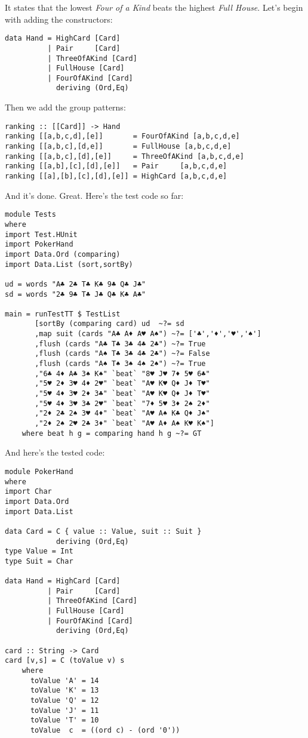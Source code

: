 It states that the lowest \emph{Four of a Kind} beats the highest \emph{Full House}.
\lhA \error Let's begin with adding the constructors:
\begin{lstlisting}[frame=single]
data Hand = HighCard [Card]
          | Pair     [Card]
          | ThreeOfAKind [Card]
          | FullHouse [Card]
          | FourOfAKind [Card]
            deriving (Ord,Eq)
\end{lstlisting}
\error Then we add the group patterns:
\begin{lstlisting}[frame=single]
ranking :: [[Card]] -> Hand
ranking [[a,b,c,d],[e]]       = FourOfAKind [a,b,c,d,e]
ranking [[a,b,c],[d,e]]       = FullHouse [a,b,c,d,e]
ranking [[a,b,c],[d],[e]]     = ThreeOfAKind [a,b,c,d,e]
ranking [[a,b],[c],[d],[e]]   = Pair     [a,b,c,d,e]
ranking [[a],[b],[c],[d],[e]] = HighCard [a,b,c,d,e] 
\end{lstlisting}
\success And it's done.
\lhN Great. Here's the test code so far:
\begin{lstlisting}[frame=single]
module Tests
where 
import Test.HUnit
import PokerHand
import Data.Ord (comparing)
import Data.List (sort,sortBy)

ud = words "A♣ 2♣ T♣ K♣ 9♣ Q♣ J♣"
sd = words "2♣ 9♣ T♣ J♣ Q♣ K♣ A♣"

main = runTestTT $ TestList 
       [sortBy (comparing card) ud  ~?= sd
       ,map suit (cards "A♣ A♦ A♥ A♠") ~?= ['♣','♦','♥','♠']
       ,flush (cards "A♣ T♣ 3♣ 4♣ 2♣") ~?= True
       ,flush (cards "A♠ T♣ 3♣ 4♣ 2♣") ~?= False
       ,flush (cards "A♠ T♠ 3♠ 4♠ 2♠") ~?= True
       ,"6♣ 4♦ A♣ 3♠ K♠" `beat` "8♥ J♥ 7♦ 5♥ 6♣"
       ,"5♥ 2♦ 3♥ 4♦ 2♥" `beat` "A♥ K♥ Q♦ J♦ T♥"
       ,"5♥ 4♦ 3♥ 2♦ 3♣" `beat` "A♥ K♥ Q♦ J♦ T♥"
       ,"5♥ 4♦ 3♥ 3♣ 2♥" `beat` "7♦ 5♥ 3♦ 2♠ 2♦"
       ,"2♦ 2♣ 2♠ 3♥ 4♦" `beat` "A♥ A♠ K♣ Q♦ J♠"
       ,"2♦ 2♠ 2♥ 2♣ 3♦" `beat` "A♥ A♦ A♠ K♥ K♠"]
    where beat h g = comparing hand h g ~?= GT
\end{lstlisting} %
\hspace*{\fill}
\lhA And here's the tested code:
\begin{lstlisting}[frame=single]
module PokerHand
where
import Char
import Data.Ord
import Data.List

data Card = C { value :: Value, suit :: Suit } 
            deriving (Ord,Eq)
type Value = Int
type Suit = Char

data Hand = HighCard [Card]
          | Pair     [Card]
          | ThreeOfAKind [Card]
          | FullHouse [Card]
          | FourOfAKind [Card]
            deriving (Ord,Eq)

card :: String -> Card
card [v,s] = C (toValue v) s
    where 
      toValue 'A' = 14
      toValue 'K' = 13
      toValue 'Q' = 12
      toValue 'J' = 11
      toValue 'T' = 10
      toValue  c  = ((ord c) - (ord '0'))
\end{lstlisting}
